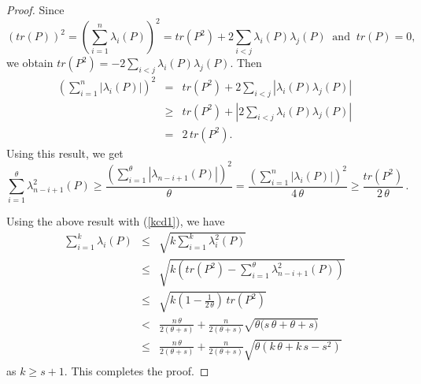 \documentclass[10pt,a4paper]{amsart}
\begin{document}
\begin{proof}
\vspace*{3mm}

Since
   $$(tr(P))^2=\left(\sum_{i=1}^{n}\lambda_i(P)\right)^2=tr(P^2)+2\sum_{i<j}\lambda_i(P)\lambda_j(P)~\mbox{ and }~tr(P)=0,$$ 
we obtain
   $tr(P^2)=-2\sum_{i<j}\lambda_i(P)\lambda_j(P)$.
Then 
    \begin{eqnarray}
 \left(\sum_{i=1}^{n}|\lambda_i(P)|\right)^2&=& tr(P^2)+2\sum_{i<j}|\lambda_i(P)\lambda_j(P)|\nonumber\\[2mm]
 &\geq &  tr(P^2)+\left|2\sum_{i<j}\lambda_i(P)\lambda_j(P)\right|\nonumber\\[2mm]
 &=&  2\,tr(P^2).\nonumber
 \end{eqnarray}
 \noindent
 Using this result, we get
  \begin{equation}
\sum_{i=1}^{\theta}\lambda_{n-i+1}^2(P)\geq
\frac{\left(\sum\limits_{i=1}^{\theta}|\lambda_{n-i+1}(P)|\right)^2}{\theta}=
\frac{\left(\sum\limits_{i=1}^{n}|\lambda_{i}(P)|\right)^2}{4\,\theta}\geq
\frac{tr(P^2)}{2\,\theta}\,.\label{e7}
 \end{equation}

 \vspace*{3mm}

 \noindent
 Using the above result with (\ref{kcd1}), we have
 \begin{eqnarray}
 \sum_{i=1}^{k}\lambda_i(P)&\leq& \sqrt{k\sum_{i=1}^{k}\lambda_i^2(P)}\nonumber\\[3mm]
     &\leq& \sqrt{k\left(tr(P^2)-\sum_{i=1}^{\theta}\lambda_{n-i+1}^2(P)\right)} \nonumber\\[3mm]
     &\leq& \sqrt{k\left(1-\frac{1}{2\,\theta}\right)\,tr(P^2)}\nonumber\\[3mm]
     &<&\frac{n\,\theta}{2(\theta+s)}+\frac{n}{2(\theta+s)}\sqrt{\theta\big(s\,\theta+\theta+s\big)}\nonumber\\[3mm]
     &\leq & \frac{n\,\theta}{2(\theta+s)}+\frac{n}{2(\theta+s)}\sqrt{\theta(k\,\theta+k\,s-s^2)}\nonumber
 \end{eqnarray}
as $k\geq s+1$. This completes the proof.
\end{proof}
\end{document}
